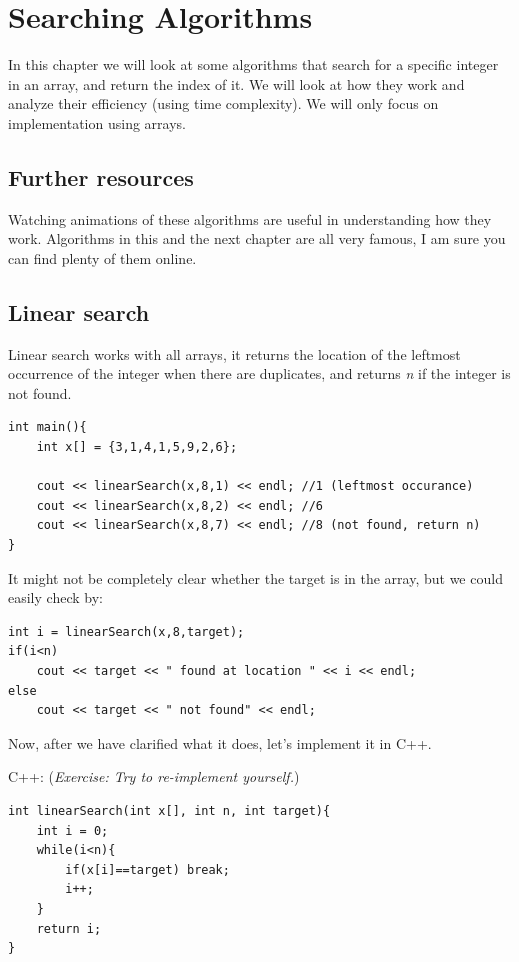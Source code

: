 \chapter{Searching Algorithms}

In this chapter we will look at some algorithms that search for a specific integer in an array, and return the index of it. We will look at how they work and analyze their efficiency (using time complexity). We will only focus on implementation using arrays.

\section{Further resources}

Watching animations of these algorithms are useful in understanding how they work. Algorithms in this and the next chapter are all very famous, I am sure you can find plenty of them online.

\section{Linear search}

Linear search works with all arrays, it returns the location of the leftmost occurrence of the integer when there are duplicates, and returns \textit{n} if the integer is not found.

\begin{lstlisting}
int main(){
    int x[] = {3,1,4,1,5,9,2,6};

    cout << linearSearch(x,8,1) << endl; //1 (leftmost occurance)
    cout << linearSearch(x,8,2) << endl; //6
    cout << linearSearch(x,8,7) << endl; //8 (not found, return n)
}
\end{lstlisting}

It might not be completely clear whether the target is in the array, but we could easily check by:

\begin{lstlisting}
int i = linearSearch(x,8,target);
if(i<n)
    cout << target << " found at location " << i << endl;
else 
    cout << target << " not found" << endl;
\end{lstlisting}

Now, after we have clarified what it does, let's implement it in C++.
\vspace{6mm}

C++: (\textit{Exercise: Try to re-implement yourself.})
\begin{lstlisting}
int linearSearch(int x[], int n, int target){
    int i = 0;
    while(i<n){
        if(x[i]==target) break;
        i++;
    }
    return i;
}
\end{lstlisting}

